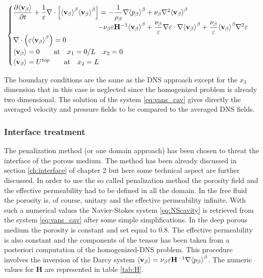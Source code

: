 \begin{eqnarray}
\begin{cases}
\dfrac{\partial {\left< \textbf{v}_{\beta} \right>}}{\partial t} + \dfrac{1}{\varepsilon} \nabla \cdot \left[  {\left< \textbf{v}_{\beta} \right>}^{\beta}  {\left< \textbf{v}_{\beta} \right>}^{\beta} \right] = -\dfrac{1}{\rho_{\beta}} \nabla {\left< p_{\beta}\right>}^{\beta} + \nu_{\beta} \nabla^2 {\left< \textbf{v}_{\beta} \right>}^{\beta} \\ 
\qquad \qquad \qquad \qquad \qquad \qquad- \nu_{\beta} \varepsilon \mathbf{H}^{-1} {\left< \textbf{v}_{\beta} \right>}^{\beta} +\dfrac{\nu_{\beta}}{\varepsilon} \nabla \varepsilon \cdot \nabla {\left< \textbf{v}_{\beta} \right>}^{\beta} + \dfrac{\nu_{\beta}}{\varepsilon} {\left< \textbf{v}_{\beta} \right>}^{\beta} \nabla^2 \varepsilon \\
\nabla \cdot \left(\varepsilon {\left< \textbf{v}_{\beta} \right>}^{\beta} \right) = 0\\
{\left< \textbf{v}_{\beta} \right>} = 0 \qquad \textrm{at} \quad x_1 = 0/L \quad x_2 = 0\\
{\left< \textbf{v}_{\beta} \right>} = U^{top} \qquad \textrm{at} \quad x_2 = L
\label{eq:vans_cav}
\end{cases}
\end{eqnarray}

The boundary conditions are the same as the DNS approach except for the $x_3$ dimension that in this case is neglected since the homogenized problem is already two dimensional.
The solution of the system \ref{eq:vans_cav} gives directly the averaged velocity and pressure fields to be compared to the averaged DNS fields.

\subsubsection{Interface treatment}
The penalization method (or one domain approach) has been chosen to threat the interface of the porous medium.
The method has been already discussed in section \ref{ch:interface}  of chapter 2 but here some technical aspect are further discussed.
In order to use the so called penalization method the porosity field and the effective permeability had to be defined in all the domain. In the free fluid the porosity is, of course, unitary and the effective permeability infinite. With such a numerical values the Navier-Stokes system \ref{eq:NScavity} is retrieved from the system \ref{eq:vans_cav} after some simple simplifications.
In the deep porous medium the porosity is constant and set equal to $0.8$. The effective permeability is also constant and the components of the tensor has been taken from a posteriori computation of the homogenized-DNS problem. This procedure involves the inversion of the Darcy system ${\left< \textbf{v}_{\beta} \right>} = \nu_{\beta} \varepsilon \mathbf{H}^{-1} \nabla {\left< p_{\beta}\right>}^{\beta}$. The numeric values for $\mathbf{H}$ are represented in table \ref{tab:H}.


